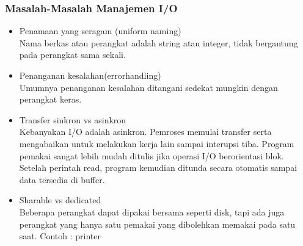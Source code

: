 \documentclass[12pt]{article}
\begin{document}
\subsubsection{Masalah-Masalah Manajemen I/O}
\begin{itemize}
    \item Penamaan yang seragam (uniform naming) \\
    Nama berkas atau perangkat adalah string atau integer, tidak bergantung pada perangkat sama sekali. 
    \item Penanganan kesalahan(errorhandling)\\
    Umumnya penanganan kesalahan ditangani sedekat mungkin dengan perangkat keras.
    \item Transfer sinkron vs asinkron \\
    Kebanyakan I/O adalah asinkron. Pemroses memulai transfer serta mengabaikan untuk melakukan kerja lain sampai interupsi tiba. Program pemakai sangat lebih mudah ditulis jika operasi I/O berorientasi blok. Setelah perintah read, program kemudian ditunda secara otomatis sampai data tersedia di buffer.
    \item Sharable vs dedicated \\
    Beberapa perangkat dapat dipakai bersama seperti disk, tapi ada juga perangkat yang hanya satu pemakai yang dibolehkan memakai pada satu saat. Contoh : printer
\end{itemize}
\end{document}
